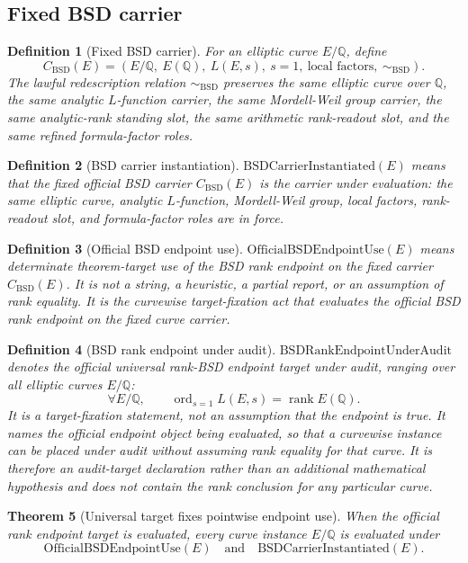 \documentclass[11pt]{article}
\newtheorem{theorem}{Theorem}[section]
\newtheorem{definition}[theorem]{Definition}
\newcommand{\Q}{\mathbb{Q}}
\newcommand{\rank}{\operatorname{rank}}
\newcommand{\ord}{\operatorname{ord}}
\newcommand{\BSD}{\mathrm{BSD}}
\begin{document}
\subsection{Fixed BSD carrier}
\begin{definition}[Fixed BSD carrier]
For an elliptic curve $E/\Q$, define
\[
C_{\BSD}(E)=
(E/\Q,\ E(\Q),\ L(E,s),\ s=1,\ \text{local factors},\ \sim_{\BSD}).
\]
The lawful redescription relation $\sim_{\BSD}$ preserves the same elliptic curve over $\Q$, the same analytic $L$-function carrier, the same Mordell-Weil group carrier, the same analytic-rank standing slot, the same arithmetic rank-readout slot, and the same refined formula-factor roles.
\end{definition}

\begin{definition}[BSD carrier instantiation]
$\mathrm{BSDCarrierInstantiated}(E)$ means that the fixed official BSD carrier $C_{\BSD}(E)$ is the carrier under evaluation: the same elliptic curve, analytic $L$-function, Mordell-Weil group, local factors, rank-readout slot, and formula-factor roles are in force.
\end{definition}

\begin{definition}[Official BSD endpoint use]
$\mathrm{OfficialBSDEndpointUse}(E)$ means determinate theorem-target use of the BSD rank endpoint on the fixed carrier $C_{\BSD}(E)$. It is not a string, a heuristic, a partial report, or an assumption of rank equality. It is the curvewise target-fixation act that evaluates the official BSD rank endpoint on the fixed curve carrier.
\end{definition}

\begin{definition}[BSD rank endpoint under audit]\label{def:rank-endpoint-under-audit}
$\mathrm{BSDRankEndpointUnderAudit}$ denotes the official universal rank-BSD endpoint target under audit, ranging over all elliptic curves $E/\Q$:
\[
\forall E/\Q,\qquad \ord_{s=1}L(E,s)=\rank E(\Q).
\]
It is a target-fixation statement, not an assumption that the endpoint is true. It names the official endpoint object being evaluated, so that a curvewise instance can be placed under audit without assuming rank equality for that curve. It is therefore an audit-target declaration rather than an additional mathematical hypothesis and does not contain the rank conclusion for any particular curve.
\end{definition}

\begin{theorem}[Universal target fixes pointwise endpoint use]\label{thm:universal-binds-pointwise}
When the official rank endpoint target is evaluated, every curve instance $E/\Q$ is evaluated under
\[
\mathrm{OfficialBSDEndpointUse}(E)
\quad\text{and}\quad
\mathrm{BSDCarrierInstantiated}(E).
\]
\end{theorem}
\end{document}
